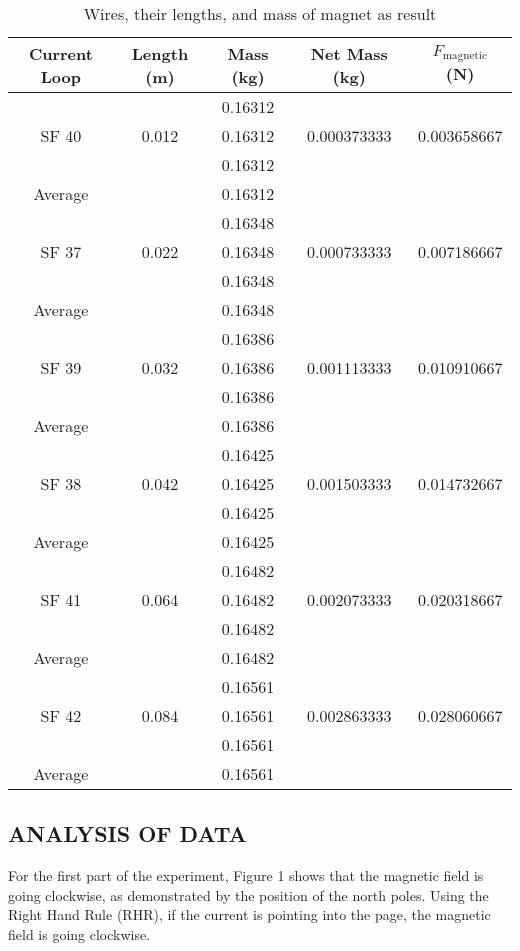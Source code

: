 \documentclass [12pt, letterpaper, twoside]{article}
\begin{document}
\begin{table}
  \centering
  \begin{tabular}{| c | c | c | c | c |}
    \hline\hline
    Current Loop & Length (m) & Mass (kg) & Net Mass (kg) & \(F_{\text{magnetic}}\) (N) \\
    \hline
    \multirow{3}{*}{SF 40} & & 0.16312 & & \\
    & 0.012 & 0.16312 & 0.000373333 & 0.003658667 \\
    & & 0.16312 & & \\
    \hline
    Average & & 0.16312 & & \\
    \hline
    \multirow{3}{*}{SF 37} & & 0.16348 & & \\
    & 0.022 & 0.16348 & 0.000733333 & 0.007186667 \\
    & & 0.16348 & & \\
    \hline
    Average & & 0.16348 & & \\
    \hline
    \multirow{3}{*}{SF 39} & & 0.16386 & & \\
    & 0.032 & 0.16386 & 0.001113333 & 0.010910667 \\
    & & 0.16386 & & \\
    \hline
    Average & & 0.16386 & & \\
    \hline
    \multirow{3}{*}{SF 38} & & 0.16425 & & \\
    & 0.042 & 0.16425 & 0.001503333 & 0.014732667 \\
    & & 0.16425 & & \\
    \hline
    Average & & 0.16425 & & \\
    \hline
    \multirow{3}{*}{SF 41} & & 0.16482 & & \\
    & 0.064 & 0.16482 & 0.002073333 & 0.020318667 \\
    & & 0.16482 & & \\
    \hline
    Average & & 0.16482 & & \\
    \hline
    \multirow{3}{*}{SF 42} & & 0.16561 & & \\
    & 0.084 & 0.16561 & 0.002863333 & 0.028060667 \\
    & & 0.16561 & & \\
    \hline
    Average & & 0.16561 & & \\
    \hline\hline
  \end{tabular}
  \caption{Wires, their lengths, and mass of magnet as result}
  \label{fig:tab2}
\end{table}

\subsection*{ANALYSIS OF DATA}
For the first part of the experiment, Figure 1 shows that the magnetic field is going clockwise, as demonstrated by the position of the north poles. Using the Right Hand Rule (RHR), if the current is pointing into the page, the magnetic field is going clockwise. 
\end{document}
